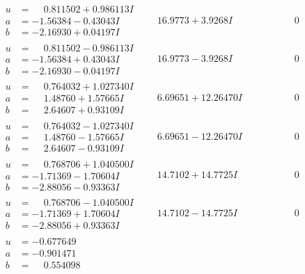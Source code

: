 \documentclass[1p]{elsarticle_modified}
\theoremstyle{definition}
\begin{document}
$$\begin{array}{c|c|c}
\begin{aligned}
u &= \phantom{-}0.811502 + 0.986113 I \\
a &= -1.56384 - 0.43043 I \\
b &= -2.16930 + 0.04197 I\end{aligned}
 & \phantom{-}16.9773 + 3.9268 I & \phantom{-0.000000 } 0 \\ \hline\begin{aligned}
u &= \phantom{-}0.811502 - 0.986113 I \\
a &= -1.56384 + 0.43043 I \\
b &= -2.16930 - 0.04197 I\end{aligned}
 & \phantom{-}16.9773 - 3.9268 I & \phantom{-0.000000 } 0 \\ \hline\begin{aligned}
u &= \phantom{-}0.764032 + 1.027340 I \\
a &= \phantom{-}1.48760 + 1.57665 I \\
b &= \phantom{-}2.64607 + 0.93109 I\end{aligned}
 & \phantom{-}6.69651 + 12.26470 I & \phantom{-0.000000 } 0 \\ \hline\begin{aligned}
u &= \phantom{-}0.764032 - 1.027340 I \\
a &= \phantom{-}1.48760 - 1.57665 I \\
b &= \phantom{-}2.64607 - 0.93109 I\end{aligned}
 & \phantom{-}6.69651 - 12.26470 I & \phantom{-0.000000 } 0 \\ \hline\begin{aligned}
u &= \phantom{-}0.768706 + 1.040500 I \\
a &= -1.71369 - 1.70604 I \\
b &= -2.88056 - 0.93363 I\end{aligned}
 & \phantom{-}14.7102 + 14.7725 I & \phantom{-0.000000 } 0 \\ \hline\begin{aligned}
u &= \phantom{-}0.768706 - 1.040500 I \\
a &= -1.71369 + 1.70604 I \\
b &= -2.88056 + 0.93363 I\end{aligned}
 & \phantom{-}14.7102 - 14.7725 I & \phantom{-0.000000 } 0 \\ \hline\begin{aligned}
u &= -0.677649\phantom{ +0.000000I} \\
a &= -0.901471\phantom{ +0.000000I} \\
b &= \phantom{-}0.554098\phantom{ +0.000000I}\end{aligned}

\end{array}$$
\end{document}
